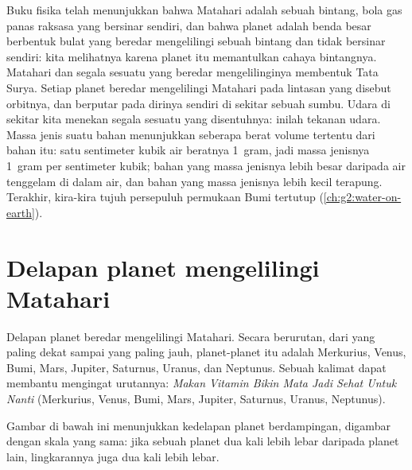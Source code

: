 \begin{recall}
Buku fisika telah menunjukkan bahwa Matahari adalah sebuah bintang, bola gas
panas raksasa yang bersinar sendiri, dan bahwa planet adalah benda besar
berbentuk bulat yang beredar mengelilingi sebuah bintang dan tidak bersinar
sendiri: kita melihatnya karena planet itu memantulkan cahaya bintangnya.
Matahari dan segala sesuatu yang beredar mengelilinginya membentuk Tata
Surya. Setiap planet beredar mengelilingi Matahari pada lintasan yang
disebut orbitnya, dan berputar pada dirinya sendiri di sekitar sebuah
sumbu. Udara di sekitar kita menekan segala sesuatu yang disentuhnya:
inilah tekanan udara. Massa jenis suatu bahan menunjukkan seberapa berat
volume tertentu dari bahan itu: satu sentimeter kubik air beratnya
1~gram, jadi massa jenisnya 1~gram per sentimeter kubik; bahan yang massa
jenisnya lebih besar daripada air tenggelam di dalam air, dan bahan yang
massa jenisnya lebih kecil terapung. Terakhir, kira-kira tujuh persepuluh
permukaan Bumi tertutup 
(\cref{ch:g2:water-on-earth}).
\end{recall}

\section{Delapan planet mengelilingi Matahari}

Delapan planet beredar mengelilingi Matahari. Secara berurutan, dari yang
paling dekat sampai yang paling jauh, planet-planet itu adalah Merkurius,
Venus, Bumi, Mars, Jupiter, Saturnus, Uranus, dan Neptunus. Sebuah kalimat
dapat membantu mengingat urutannya: \emph{Makan Vitamin Bikin Mata Jadi
Sehat Untuk Nanti} (Merkurius, Venus, Bumi, Mars, Jupiter, Saturnus,
Uranus, Neptunus).

Gambar di bawah ini menunjukkan kedelapan planet berdampingan, digambar
dengan skala yang sama: jika sebuah planet dua kali lebih lebar daripada
planet lain, lingkarannya juga dua kali lebih lebar.

